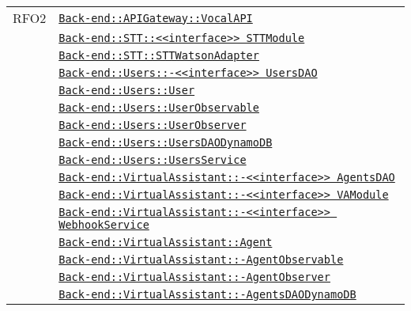 \begin{longtable}{|>{\centering}m{3cm}|m{10cm}<{\centering}|}
RFO2 & \hyperref[Back-end::APIGateway::VocalAPI]{\texttt{Back-end::APIGateway::VocalAPI}}\\
& \hyperref[Back-end::STT::<<interface>> STTModule]{\texttt{Back-end::STT::<<interface>> STTModule}}\\
& \hyperref[Back-end::STT::STTWatsonAdapter]{\texttt{Back-end::STT::STTWatsonAdapter}}\\
& \hyperref[Back-end::Users::<<interface>> UsersDAO]{\texttt{Back-end::Users::-\linebreak <<interface>> UsersDAO}}\\
& \hyperref[Back-end::Users::User]{\texttt{Back-end::Users::User}}\\
& \hyperref[Back-end::Users::UserObservable]{\texttt{Back-end::Users::UserObservable}}\\
& \hyperref[Back-end::Users::UserObserver]{\texttt{Back-end::Users::UserObserver}}\\
& \hyperref[Back-end::Users::UsersDAODynamoDB]{\texttt{Back-end::Users::UsersDAODynamoDB}}\\
& \hyperref[Back-end::Users::UsersService]{\texttt{Back-end::Users::UsersService}}\\
& \hyperref[Back-end::VirtualAssistant::<<interface>> AgentsDAO]{\texttt{Back-end::VirtualAssistant::-\linebreak <<interface>> AgentsDAO}}\\
& \hyperref[Back-end::VirtualAssistant::<<interface>> VAModule]{\texttt{Back-end::VirtualAssistant::-\linebreak <<interface>> VAModule}}\\
& \hyperref[Back-end::VirtualAssistant::<<interface>> WebhookService]{\texttt{Back-end::VirtualAssistant::-\linebreak <<interface>> WebhookService}}\\
& \hyperref[Back-end::VirtualAssistant::Agent]{\texttt{Back-end::VirtualAssistant::Agent}}\\
& \hyperref[Back-end::VirtualAssistant::AgentObservable]{\texttt{Back-end::VirtualAssistant::-\linebreak AgentObservable}}\\
& \hyperref[Back-end::VirtualAssistant::AgentObserver]{\texttt{Back-end::VirtualAssistant::-\linebreak AgentObserver}}\\
& \hyperref[Back-end::VirtualAssistant::AgentsDAODynamoDB]{\texttt{Back-end::VirtualAssistant::-\linebreak AgentsDAODynamoDB}}\\

\end{longtable}
